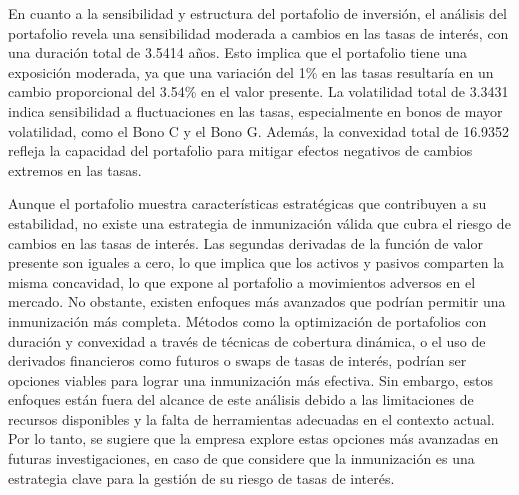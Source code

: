 \documentclass[12pt]{article}
\begin{document}
En cuanto a la sensibilidad y estructura del portafolio de inversión, el análisis del portafolio revela una sensibilidad moderada a cambios en las tasas de interés, con una duración total de 3.5414 años. Esto implica que el portafolio tiene una exposición moderada, ya que una variación del 1\% en las tasas resultaría en un cambio proporcional del 3.54\% en el valor presente. La volatilidad total de 3.3431 indica sensibilidad a fluctuaciones en las tasas, especialmente en bonos de mayor volatilidad, como el Bono C y el Bono G. Además, la convexidad total de 16.9352 refleja la capacidad del portafolio para mitigar efectos negativos de cambios extremos en las tasas.

Aunque el portafolio muestra características estratégicas que contribuyen a su estabilidad, no existe una estrategia de inmunización válida que cubra el riesgo de cambios en las tasas de interés. Las segundas derivadas de la función de valor presente son iguales a cero, lo que implica que los activos y pasivos comparten la misma concavidad, lo que expone al portafolio a movimientos adversos en el mercado. No obstante, existen enfoques más avanzados que podrían permitir una inmunización más completa. Métodos como la optimización de portafolios con duración y convexidad a través de técnicas de cobertura dinámica, o el uso de derivados financieros como futuros o swaps de tasas de interés, podrían ser opciones viables para lograr una inmunización más efectiva. Sin embargo, estos enfoques están fuera del alcance de este análisis debido a las limitaciones de recursos disponibles y la falta de herramientas adecuadas en el contexto actual. Por lo tanto, se sugiere que la empresa explore estas opciones más avanzadas en futuras investigaciones, en caso de que considere que la inmunización es una estrategia clave para la gestión de su riesgo de tasas de interés.


\newpage
\nocite{*}
\printbibliography[heading=bibintoc, title={Referencias}]
\end{document}
